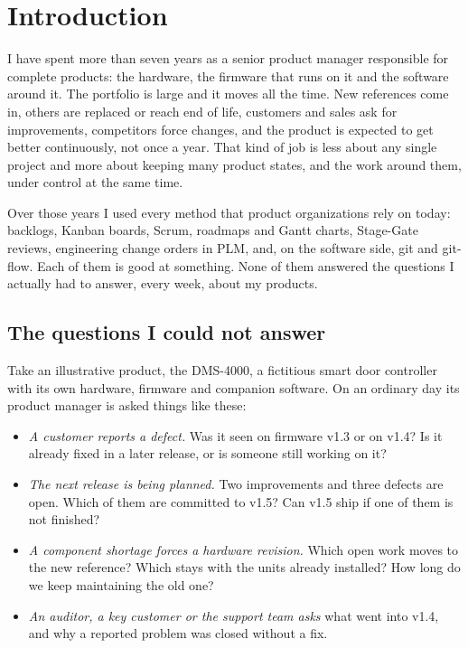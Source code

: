 \section{Introduction}
\label{sec:introduction}

I have spent more than seven years as a senior product manager responsible
for complete products: the hardware, the firmware that runs on it and the
software around it. The portfolio is large and it moves all the time. New
references come in, others are replaced or reach end of life, customers
and sales ask for improvements, competitors force changes, and the product
is expected to get better continuously, not once a year. That kind of job
is less about any single project and more about keeping many product
states, and the work around them, under control at the same time.

Over those years I used every method that product organizations rely on
today: backlogs, Kanban boards, Scrum, roadmaps and Gantt charts,
Stage-Gate reviews, engineering change orders in PLM, and, on the software
side, git and git-flow. Each of them is good at something. None of them
answered the questions I actually had to answer, every week, about my
products.

\subsection{The questions I could not answer}
\label{sec:intro-questions}

Take an illustrative product, the DMS-4000, a fictitious smart door
controller with its own hardware, firmware and companion software. On an
ordinary day its product manager is asked things like these:
\begin{itemize}[leftmargin=1.5em,itemsep=2pt,topsep=3pt]
  \item \emph{A customer reports a defect.} Was it seen on firmware v1.3 or
        on v1.4? Is it already fixed in a later release, or is someone
        still working on it?
  \item \emph{The next release is being planned.} Two improvements and
        three defects are open. Which of them are committed to v1.5? Can
        v1.5 ship if one of them is not finished?
  \item \emph{A component shortage forces a hardware revision.} Which open
        work moves to the new reference? Which stays with the units already
        installed? How long do we keep maintaining the old one?
  \item \emph{An auditor, a key customer or the support team asks} what
        went into v1.4, and why a reported problem was closed without a
        fix.
\end{itemize}

